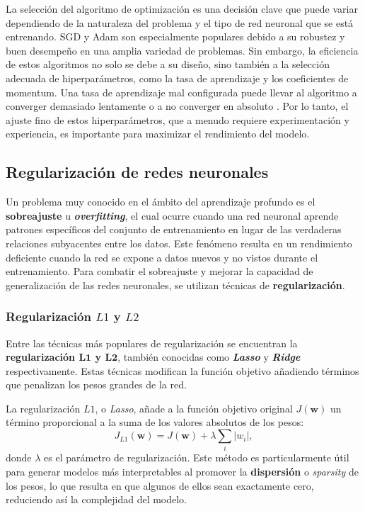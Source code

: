 La selección del algoritmo de optimización es una decisión clave que puede variar dependiendo de la naturaleza del problema y el tipo de red neuronal que se está entrenando. SGD y Adam son especialmente populares debido a su robustez y buen desempeño en una amplia variedad de problemas. Sin embargo, la eficiencia de estos algoritmos no solo se debe a su diseño, sino también a la selección adecuada de hiperparámetros, como la tasa de aprendizaje y los coeficientes de momentum. Una tasa de aprendizaje mal configurada puede llevar al algoritmo a converger demasiado lentamente o a no converger en absoluto \cite{bottou2018optimization}. Por lo tanto, el ajuste fino de estos hiperparámetros, que a menudo requiere experimentación y experiencia, es importante para maximizar el rendimiento del modelo.

\subsection{Regularización de redes neuronales}

Un problema muy conocido en el ámbito del aprendizaje profundo es el \textbf{sobreajuste} u \textbf{\textit{overfitting}}, el cual ocurre cuando una red neuronal aprende patrones específicos del conjunto de entrenamiento en lugar de las verdaderas relaciones subyacentes entre los datos. Este fenómeno resulta en un rendimiento deficiente cuando la red se expone a datos nuevos y no vistos durante el entrenamiento. Para combatir el sobreajuste y mejorar la capacidad de generalización de las redes neuronales, se utilizan técnicas de \textbf{regularización}.

\subsubsection{Regularización $L1$ y $L2$}

Entre las técnicas más populares de regularización se encuentran la \textbf{regularización $\mathbf{L1}$ y $\mathbf{L2}$}, también conocidas como \textbf{\textit{Lasso}} y \textbf{\textit{Ridge}} respectivamente. Estas técnicas modifican la función objetivo añadiendo términos que penalizan los pesos grandes de la red.

La regularización $L1$, o \textit{Lasso}, añade a la función objetivo original $J(\mathbf{w})$ un término proporcional a la suma de los valores absolutos de los pesos:
\[
J_{L1}(\mathbf{w}) = J(\mathbf{w}) + \lambda \sum_{i} |w_i|,
\]
donde $\lambda$ es el parámetro de regularización. Este método es particularmente útil para generar modelos más interpretables al promover la \textbf{dispersión} o \textit{sparsity} de los pesos, lo que resulta en que algunos de ellos sean exactamente cero, reduciendo así la complejidad del modelo.

